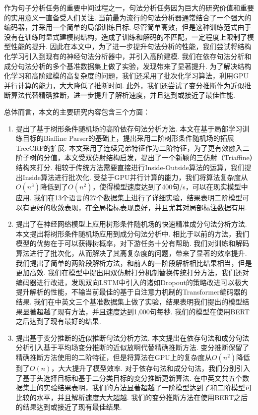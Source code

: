
\begin{cabstract}
  作为句子分析任务的重要中间过程之一，句法分析任务因为巨大的研究价值和重要的实用意义一直备受人们关注.
  当前最为流行的句法分析器通常结合了一个强大的编码器，并采用一个简单的局部训练目标.
  尽管简单高效，但是这种训练范式由于没有在训练时显式建模树结构，造成了训练和解码的不匹配，一定程度上限制了模型性能的提升.
  因此在本文中，为了进一步提升句法分析的性能，我们尝试将结构化学习引入到现有的神经句法分析器中，并引入高阶建模.
  我们在依存句法分析和成分句法分析的多个基准数据集上做了实验，发现带来了显著提升.
  为了解决结构化学习和高阶建模的高复杂度的问题，我们还采用了批次化学习算法，利用GPU并行计算的能力，大大降低了推断时间.
  此外，我们还尝试了变分推断作为近似推断算法代替精确推断，进一步提升了解析速度，并且达到或接近了最佳性能.

  总体而言，本文的主要研究内容包含三个方面：
  \begin{enumerate}
    \item 提出了基于树形条件随机场的高阶依存句法分析方法.
          本文在基于局部学习训练目标的Biaffine Parser的基础上，提出采用二阶树形条件随机场的拓展TreeCRF的扩展.
          本文采用了连续兄弟特征作为二阶特征，为了更有效融入二阶子树的分值，本文受双仿射结构启发，提出了一个新颖的三仿射（Triaffine）结构来打分.
          相较于传统方法需要直接进行Inside-Outside算法的运算，我们提出Inside算法进行批次化.
          受益于GPU并行计算的能力，我们将算法复杂度从$O(n^3)$降低到了$O(n^2)$，使得模型速度达到了400句/s，可以在现实模型中应用.
          我们在13个语言的27个数据集上进行了详细实验，结果表明二阶模型可以有更好的收敛表现，在全局指标表现良好，并且尤其对局部标注数据有用.
    \item 提出了在神经网络模型上应用树形条件随机场的快速精准成分句法分析方法.
          本文提出将树形条件随机场应用到成分句法分析中.
          相比于以前的方法，我们模型的优势在于可以获得树概率，对下游任务十分有帮助.
          我们对训练和解码算法进行了批次化，从而解决了其高复杂度的问题，带来了显著的效率提升.
          我们提出了简单的两阶段解析方法，和前人的一阶段解析相比结果相当，但是更加高效.
          我们在模型中提出用双仿射打分机制替换传统打分方法，我们还对编码器进行改进，发现双向LSTM中引入的诸如Dropout的策略改进可以极大提升解析的性能，不输当前最佳的基于自注意力机制的Transformer编码器的结果.
          我们在中英文三个基准数据集上做了实验，结果表明我们提出的模型结果显著超越了现有方法，并且速度达到1,000句每秒.
          我们的模型在使用BERT之后达到了现有最好的结果.
    \item 提出基于变分推断的近似推断句法分析方法.
          本文提出在依存句法和成分句法分析引入基于平均场变分推断的近似放啊代替精确推断方法.
          变分推断保留了精确推断方法使用的二阶特征，但是将算法在GPU上的复杂度从$O(n^2)$降低到了$O(n)$，大大提升了模型效率.
          对于依存句法和成分句法，我们分别引入了基于头选择目标和基于二分类目标的变分推断更新算法.
          在中英文共五个数据集上的实验结果表明，我们的方法显著超越了一阶模型达到了和二阶模型可比较的水平，并且解析速度大大超越.
          我们的变分推断方法在使用BERT之后的结果达到或接近了现有最佳结果.
  \end{enumerate}




\end{cabstract}
